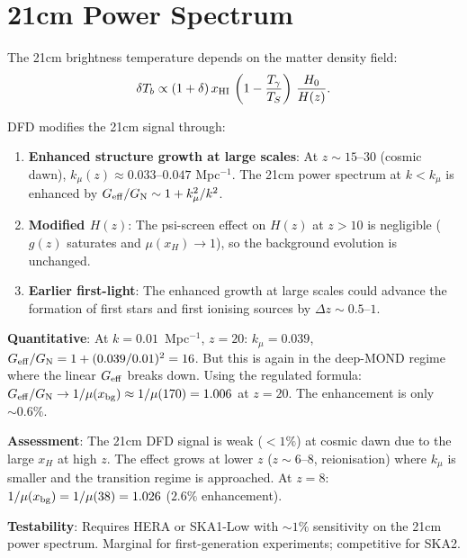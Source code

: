 \documentclass[11pt,a4paper]{article}
\newcounter{findingctr}
\newenvironment{finding}[1][]{%
  \refstepcounter{findingctr}%
  \begin{tcolorbox}[colback=blue!3!white, colframe=blue!50!black,
    title=\textbf{Finding \thefindingctr: #1}]
}{%
  \end{tcolorbox}%
}
\newcommand{\mufd}{\mu}
\newcommand{\GN}{G_{\rm N}}
\newcommand{\Geff}{G_{\rm eff}}
\newcommand{\kmu}{k_\mu}
\begin{document}
\section{21cm Power Spectrum}
\label{sec:new-21cm}

\begin{finding}[\textbf{NEW}: DFD 21cm Signal Enhancement at $z > 10$]
\label{find:21cm}

The 21cm brightness temperature depends on the matter density field:
\begin{equation}
\delta T_b \propto (1 + \delta)\,x_{\rm HI}\,
\left(1 - \frac{T_\gamma}{T_S}\right)\,\frac{H_0}{H(z)}.
\end{equation}

DFD modifies the 21cm signal through:
\begin{enumerate}[nosep]
\item \textbf{Enhanced structure growth at large scales}: At
  $z \sim 15$--$30$ (cosmic dawn), $\kmu(z) \approx 0.033$--$0.047$
  Mpc$^{-1}$.  The 21cm power spectrum at $k < \kmu$ is enhanced
  by $\Geff/\GN \sim 1 + \kmu^2/k^2$.

\item \textbf{Modified $H(z)$}: The psi-screen effect on $H(z)$ at
  $z > 10$ is negligible ($g(z)$ saturates and $\mu(x_H) \to 1$),
  so the background evolution is unchanged.

\item \textbf{Earlier first-light}: The enhanced growth at large
  scales could advance the formation of first stars and first
  ionising sources by $\Delta z \sim 0.5$--$1$.
\end{enumerate}

\textbf{Quantitative}: At $k = 0.01$~Mpc$^{-1}$, $z = 20$:
$\kmu = 0.039$, $\Geff/\GN = 1 + (0.039/0.01)^2 = 16$.
But this is again in the deep-MOND regime where the linear
$\Geff$ breaks down.  Using the regulated formula:
$\Geff/\GN \to 1/\mufd(x_{\rm bg}) \approx 1/\mufd(170) = 1.006$
at $z = 20$.  The enhancement is only $\sim 0.6\%$.

\textbf{Assessment}: The 21cm DFD signal is weak ($< 1\%$) at
cosmic dawn due to the large $x_H$ at high $z$.  The effect grows
at lower $z$ ($z \sim 6$--$8$, reionisation) where $\kmu$ is
smaller and the transition regime is approached.  At $z = 8$:
$1/\mufd(x_{\rm bg}) = 1/\mufd(38) = 1.026$ ($2.6\%$ enhancement).

\textbf{Testability}: Requires HERA or SKA1-Low with $\sim 1\%$
sensitivity on the 21cm power spectrum.  Marginal for first-generation
experiments; competitive for SKA2.

\end{finding}
\end{document}
